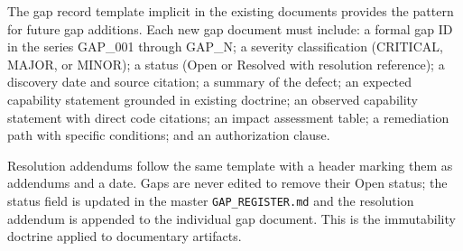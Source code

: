 The gap record template implicit in the existing documents provides the pattern for
future gap additions. Each new gap document must include: a formal gap ID in the series
GAP\_001 through GAP\_N; a severity classification (CRITICAL, MAJOR, or MINOR); a
status (Open or Resolved with resolution reference); a discovery date and source
citation; a summary of the defect; an expected capability statement grounded in
existing doctrine; an observed capability statement with direct code citations; an
impact assessment table; a remediation path with specific conditions; and an
authorization clause.

Resolution addendums follow the same template with a header marking them as addendums
and a date. Gaps are never edited to remove their Open status; the status field is
updated in the master \texttt{GAP\_REGISTER.md} and the resolution addendum is appended
to the individual gap document. This is the immutability doctrine applied to documentary
artifacts.
